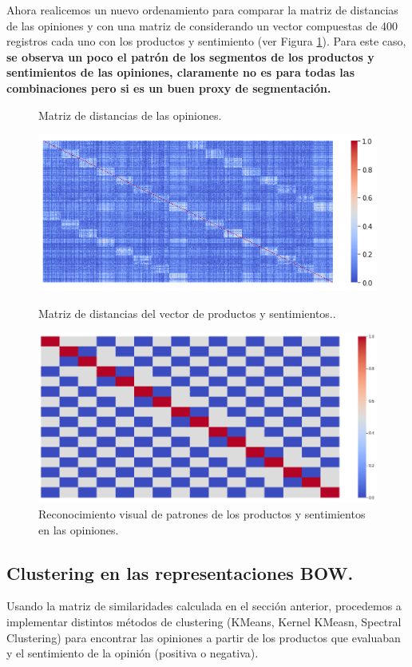 \documentclass[paper=letter, fontsize=11pt]{scrartcl}
\numberwithin{equation}{section} %
\numberwithin{figure}{section} %
\numberwithin{table}{section} %
\begin{document}
Ahora realicemos un nuevo ordenamiento para comparar la matriz de distancias de las opiniones y con una matriz de considerando un vector compuestas de 400 registros cada uno con los productos y sentimiento (ver Figura \ref{fig:productos_sentimientos_distancia}). Para este caso, \textbf{se observa un poco el patrón de los segmentos de los productos y sentimientos de las opiniones, claramente no es para todas las combinaciones pero si es un buen proxy de segmentación.}
\begin{figure}[!htb]
\caption{Matriz de distancias de las opiniones.}
  \includegraphics[width=\linewidth]{figure/bow_productos_sentimientos.png}
\endminipage\hfill
{}
\caption{Matriz de distancias del vector de productos y sentimientos..}
  \includegraphics[width=\linewidth]{figure/productos_sentimientos_distancia.png}
\endminipage
\caption{Reconocimiento visual de patrones de los productos y sentimientos en las opiniones.}
\label{fig:productos_sentimientos_distancia}
\end{figure}


\subsection{Clustering en las representaciones BOW.}
Usando la matriz de similaridades calculada en el sección anterior, procedemos a implementar distintos métodos de clustering (KMeans, Kernel KMeasn, Spectral Clustering) para encontrar las opiniones a partir de los productos que evaluaban y el sentimiento de la opinión (positiva o negativa).\\
\end{document}
